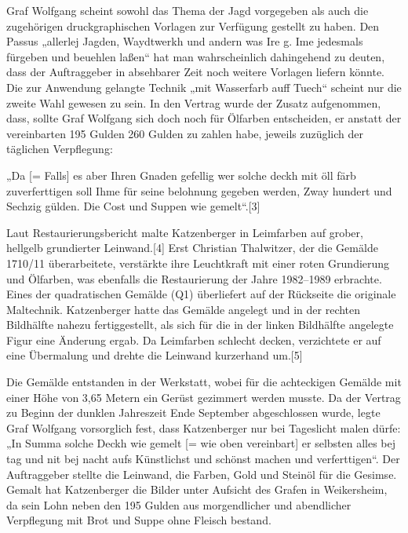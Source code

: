 \documentclass[
  letterpaper,
]{book}
\begin{document}
Graf Wolfgang scheint sowohl das Thema der Jagd vorgegeben als auch die
zugehörigen druckgraphischen Vorlagen zur Verfügung gestellt zu haben.
Den Passus „allerlej Jagden, Waydtwerkh und andern was Ire g. Ime
jedesmals fürgeben und beuehlen laßen`` hat man wahrscheinlich
dahingehend zu deuten, dass der Auftraggeber in absehbarer Zeit noch
weitere Vorlagen liefern könnte. Die zur Anwendung gelangte Technik „mit
Wasserfarb auff Tuech`` scheint nur die zweite Wahl gewesen zu sein. In
den Vertrag wurde der Zusatz aufgenommen, dass, sollte Graf Wolfgang
sich doch noch für Ölfarben entscheiden, er anstatt der vereinbarten 195
Gulden 260 Gulden zu zahlen habe, jeweils zuzüglich der täglichen
Verpflegung:

„Da {[}= Falls{]} es aber Ihren Gnaden gefellig wer solche deckh mit öll
färb zuverferttigen soll Ihme für seine belohnung gegeben werden, Zway
hundert und Sechzig gülden. Die Cost und Suppen wie gemelt``.{[}3{]}

Laut Restaurierungsbericht malte Katzenberger in Leimfarben auf grober,
hellgelb grundierter Leinwand.{[}4{]} Erst Christian Thalwitzer, der die
Gemälde 1710/11 überarbeitete, verstärkte ihre Leuchtkraft mit einer
roten Grundierung und Ölfarben, was ebenfalls die Restaurierung der
Jahre 1982--1989 erbrachte. Eines der quadratischen Gemälde (Q1)
überliefert auf der Rückseite die originale Maltechnik. Katzenberger
hatte das Gemälde angelegt und in der rechten Bildhälfte nahezu
fertiggestellt, als sich für die in der linken Bildhälfte angelegte
Figur eine Änderung ergab. Da Leimfarben schlecht decken, verzichtete er
auf eine Übermalung und drehte die Leinwand kurzerhand um.{[}5{]}

Die Gemälde entstanden in der Werkstatt, wobei für die achteckigen
Gemälde mit einer Höhe von 3,65 Metern ein Gerüst gezimmert werden
musste. Da der Vertrag zu Beginn der dunklen Jahreszeit Ende September
abgeschlossen wurde, legte Graf Wolfgang vorsorglich fest, dass
Katzenberger nur bei Tageslicht malen dürfe: „In Summa solche Deckh wie
gemelt {[}= wie oben vereinbart{]} er selbsten alles bej tag und nit bej
nacht aufs Künstlichst und schönst machen und verferttigen``. Der
Auftraggeber stellte die Leinwand, die Farben, Gold und Steinöl für die
Gesimse. Gemalt hat Katzenberger die Bilder unter Aufsicht des Grafen in
Weikersheim, da sein Lohn neben den 195 Gulden aus morgendlicher und
abendlicher Verpflegung mit Brot und Suppe ohne Fleisch bestand.
\end{document}
